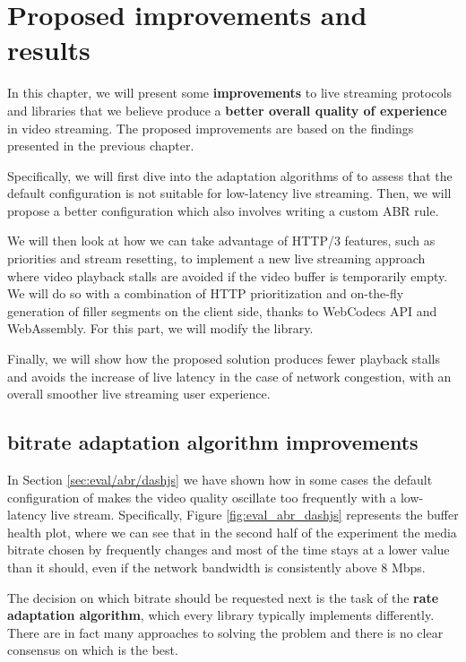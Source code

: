 \chapter{Proposed improvements and results}
\label{cha:improvements}

In this chapter, we will present some \textbf{improvements} to live streaming protocols and libraries that we believe produce a \textbf{better overall quality of experience} in video streaming. The proposed improvements are based on the findings presented in the previous chapter.

Specifically, we will first dive into the adaptation algorithms of \dashjs{} to assess that the default configuration is not suitable for low-latency live streaming. Then, we will propose a better configuration which also involves writing a custom ABR rule.

We will then look at how we can take advantage of HTTP/3 features, such as priorities and stream resetting, to implement a new live streaming approach where video playback stalls are avoided if the video buffer is temporarily empty. We will do so with a combination of HTTP prioritization and on-the-fly generation of filler segments on the client side, thanks to WebCodecs API and WebAssembly. For this part, we will modify the \hlsjs{} library.

Finally, we will show how the proposed solution produces fewer playback stalls and avoids the increase of live latency in the case of network congestion, with an overall smoother live streaming user experience.

\section{\dashjs{} bitrate adaptation algorithm improvements}
\label{sec:improvements/dashjs}

In Section \ref{sec:eval/abr/dashjs} we have shown how in some cases the default configuration of \dashjs{} makes the video quality oscillate too frequently with a low-latency live stream. Specifically, Figure \ref{fig:eval_abr_dashjs} represents the buffer health plot, where we can see that in the second half of the experiment the media bitrate chosen by \dashjs{} frequently changes and most of the time stays at a lower value than it should, even if the network bandwidth is consistently above 8 Mbps.

The decision on which bitrate should be requested next is the task of the \textbf{rate adaptation algorithm}, which every library typically implements differently. There are in fact many approaches to solving the problem and there is no clear consensus on which is the best.

